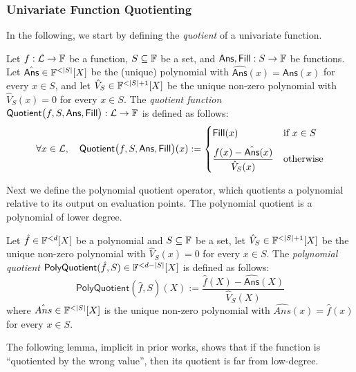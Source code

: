 \subsubsection{Univariate Function Quotienting}\label{sec:quotienting}

In the following, we start by defining the \emph{quotient} of a univariate function.
\begin{definition}\label{def:quotient}
    Let $f:\mathcal{L}\to\mathbb{F}$ be a function, $S\subseteq\mathbb{F}$ be a set, and $\mathsf{Ans},\mathsf{Fill}: S\rightarrow\mathbb{F}$ be functions. Let $\hat{\mathsf{Ans}}\in\field^{<|S|}[X]$ be the (unique) polynomial with $\hat{\mathsf{Ans}}(x)=\mathsf{Ans}(x)$ for every $x\in S$, and let $\hat{V}_S\in\field^{<|S|+1}[X]$ be the unique non-zero polynomial with $\hat{V}_S(x)=0$ for every $x\in S$.
    The \emph{quotient function} $\mathsf{Quotient}\bigl(f,S,\mathsf{Ans},\mathsf{Fill}\bigr): \mathcal{L}\to\mathbb{F}$
    is defined as follows:
\[
\forall x \in \mathcal{L},\quad
\mathsf{Quotient}\bigl(f,S,\mathsf{Ans},\mathsf{Fill}\bigr)(x)
:=
\begin{cases}
\mathsf{Fill}(x)
& \text{if } x \in S \\[6pt]
\dfrac{f(x) - \hat{\mathsf{Ans}}(x)}{\hat{V}_S(x)}
& \text{otherwise}
\end{cases}
\]
\end{definition}

Next we define the polynomial quotient operator, which quotients a polynomial relative to its output on evaluation points. The polynomial quotient is a polynomial of lower degree.

\begin{definition}\label{def:poly_quotient}
    Let $\hat{f}\in\mathbb{F}^{<d}[X]$ be a polynomial and $S\subseteq\mathbb{F}$ be a set, let $\hat{V}_S\in\field^{<|S|+1}[X]$ be the unique non-zero polynomial with $\hat{V}_S(x)=0$ for every $x\in S$. The \emph{polynomial quotient} $\mathsf{PolyQuotient}(\hat{f},S)\in\mathbb{F}^{<d-|S|}[X]$ is defined as follows:
    \[
            \mathsf{PolyQuotient}(\hat{f},S)(X):=\frac{\hat{f}(X)-\hat{\mathsf{Ans}}(X)}{\hat{V}_S(X)}
    \]
where $\hat{Ans}\in\field^{<|S|}[X]$ is the unique non-zero polynomial with $\hat{Ans}(x)=\hat{f}(x)$ for every $x \in S$.
\end{definition}

The following lemma, implicit in prior works, shows that if the function is ``quotiented by the wrong value'', then its quotient is far from low-degree.

